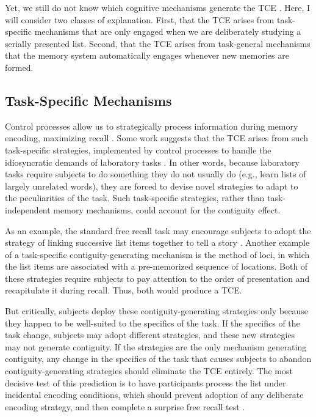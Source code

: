 \documentclass[man,natbib,floatsintext]{apa6} %
\begin{document}
Yet, we still do not know which cognitive mechanisms generate the TCE \citep{HealKaha17}. Here, I will consider two classes of explanation. First, that the TCE arises from task-specific mechanisms that are only engaged when we are deliberately studying a serially presented list. Second, that the TCE arises from task-general mechanisms that the memory system automatically engages whenever new memories are formed.

\label{TODO-2}   
\subsection{Task-Specific Mechanisms}
Control processes \citep{LehmMalm13,AtkiShif68} allow us to strategically process information during memory encoding, maximizing recall \citep[e.g.,][]{Unsw16,DelaKnow05}. Some work suggests that the TCE arises from such task-specific strategies, implemented by control processes to handle the idiosyncratic demands of laboratory tasks \citep{Hint16}. In other words, because laboratory tasks require subjects to do something they do not usually do (e.g., learn lists of largely unrelated words), they are forced to devise novel strategies to adapt to the peculiarities of the task. Such task-specific strategies, rather than task-independent memory mechanisms, could account for the contiguity effect.

As an example, the standard free recall task may encourage subjects to adopt the strategy of linking successive list items together to tell a story \citep{DelaKnow05}. Another example of a task-specific contiguity-generating mechanism is the method of loci, in which the list items are associated with a pre-memorized sequence of locations. Both of these strategies require subjects to pay attention to the order of presentation and recapitulate it during recall. Thus, both would produce a TCE.

But critically, subjects deploy these contiguity-generating strategies only because they happen to be well-suited to the specifics of the task. If the specifics of the task change, subjects may adopt different strategies, and these new strategies may not generate contiguity.
If the strategies are the only mechanism generating contiguity, any change in the specifics of the task that causes subjects to abandon contiguity-generating strategies should eliminate the TCE entirely. The most decisive test of this prediction is to have participants process the list under incidental encoding conditions, which should prevent adoption of any deliberate encoding strategy, and then complete a surprise free recall test \citep{Hint16}.
\end{document}
